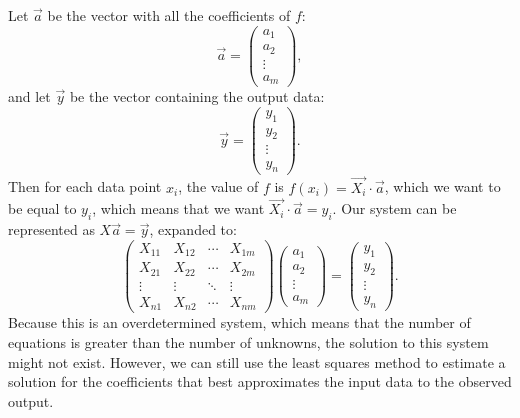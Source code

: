 \documentclass[11pt, oneside, reqno]{book}
\begin{document}
Let $\vec{a}$ be the vector with all the coefficients of $f$:
\[
\vec{a} = \begin{pmatrix}
a_1 \\
a_2 \\
\vdots \\
a_m
\end{pmatrix},
\]
and let $\vec{y}$ be the vector containing the output data:
\[
\vec{y} = \begin{pmatrix}
y_1 \\
y_2 \\
\vdots \\
y_n
\end{pmatrix}.
\]
Then for each data point $x_i$, the value of $f$ is $f(x_i) = \vec{X_i} \cdot \vec{a} $, which we want to be equal to $y_i$, which means that we want $\vec{X_i} \cdot \vec{a} = y_i$. Our system can be represented as $X\vec{a} = \vec{y}$, expanded to:
\[
\begin{pmatrix}
X_{11} & X_{12} & \cdots & X_{1m} \\
X_{21} & X_{22} & \cdots & X_{2m} \\
\vdots  & \vdots  & \ddots & \vdots  \\
X_{n1} & X_{n2} & \cdots & X_{nm}
\end{pmatrix}
\begin{pmatrix}
a_1 \\
a_2 \\
\vdots \\
a_m
\end{pmatrix}
=
\begin{pmatrix}
y_1 \\
y_2 \\
\vdots \\
y_n
\end{pmatrix}.
\]
Because this is an overdetermined system, which means that the number of equations is greater than the number of unknowns, the solution to this system might not exist. However, we can still use the least squares method to estimate a solution for the coefficients that best approximates the input data to the observed output. 
\end{document}
